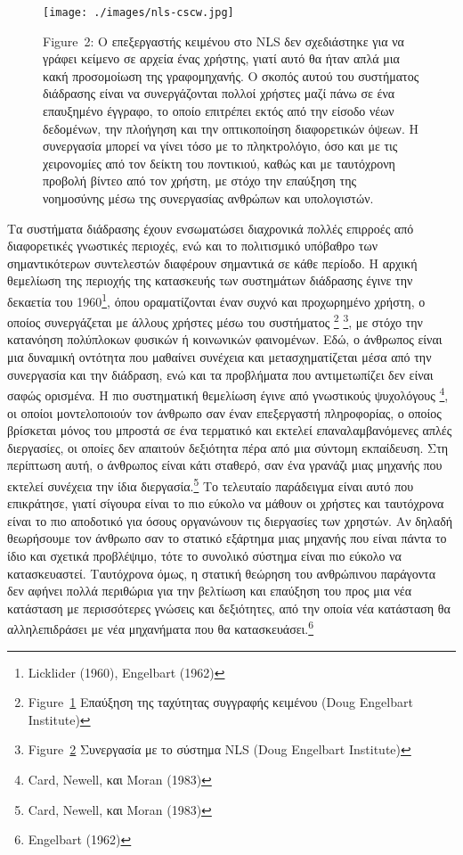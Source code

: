 \documentclass[
]{article}
\begin{document}
\leavevmode{}%
\begin{figure}
\hypertarget{fig:nls-cscw}{%
\centering
\texttt{[image: ./images/nls-cscw.jpg]}
\caption{Figure~2: Ο επεξεργαστής κειμένου στο NLS δεν σχεδιάστηκε για
να γράφει κείμενο σε αρχεία ένας χρήστης, γιατί αυτό θα ήταν απλά μια
κακή προσομοίωση της γραφομηχανής. Ο σκοπός αυτού του συστήματος
διάδρασης είναι να συνεργάζονται πολλοί χρήστες μαζί πάνω σε ένα
επαυξημένο έγγραφο, το οποίο επιτρέπει εκτός από την είσοδο νέων
δεδομένων, την πλοήγηση και την οπτικοποίηση διαφορετικών όψεων. Η
συνεργασία μπορεί να γίνει τόσο με το πληκτρολόγιο, όσο και με τις
χειρονομίες από τον δείκτη του ποντικιού, καθώς και με ταυτόχρονη
προβολή βίντεο από τον χρήστη, με στόχο την επαύξηση της νοημοσύνης μέσω
της συνεργασίας ανθρώπων και υπολογιστών.}\label{fig:nls-cscw}
}
\end{figure}

Τα συστήματα διάδρασης έχουν ενσωματώσει διαχρονικά πολλές επιρροές από
διαφορετικές γνωστικές περιοχές, ενώ και το πολιτισμικό υπόβαθρο των
σημαντικότερων συντελεστών διαφέρουν σημαντικά σε κάθε περίοδο. Η αρχική
θεμελίωση της περιοχής της κατασκευής των συστημάτων διάδρασης έγινε την
δεκαετία του 1960\footnote{Licklider (1960), Engelbart (1962)}, όπου
οραματίζονται έναν συχνό και προχωρημένο χρήστη, ο οποίος συνεργάζεται
με άλλους χρήστες μέσω του συστήματος \footnote{Figure~\protect\hyperlink{fig:augmentation-typewriter}{1}
  Επαύξηση της ταχύτητας συγγραφής κειμένου (Doug Engelbart Institute)}
\footnote{Figure~\protect\hyperlink{fig:nls-cscw}{2} Συνεργασία με το
  σύστημα NLS (Doug Engelbart Institute)}, με στόχο την κατανόηση
πολύπλοκων φυσικών ή κοινωνικών φαινομένων. Εδώ, ο άνθρωπος είναι μια
δυναμική οντότητα που μαθαίνει συνέχεια και μετασχηματίζεται μέσα από
την συνεργασία και την διάδραση, ενώ και τα προβλήματα που αντιμετωπίζει
δεν είναι σαφώς ορισμένα. Η πιο συστηματική θεμελίωση έγινε από
γνωστικούς ψυχολόγους \footnote{Card, Newell, και Moran (1983)}, οι
οποίοι μοντελοποιούν τον άνθρωπο σαν έναν επεξεργαστή πληροφορίας, ο
οποίος βρίσκεται μόνος του μπροστά σε ένα τερματικό και εκτελεί
επαναλαμβανόμενες απλές διεργασίες, οι οποίες δεν απαιτούν δεξιότητα
πέρα από μια σύντομη εκπαίδευση. Στη περίπτωση αυτή, ο άνθρωπος είναι
κάτι σταθερό, σαν ένα γρανάζι μιας μηχανής που εκτελεί συνέχεια την ίδια
διεργασία.\footnote{Card, Newell, και Moran (1983)} Το τελευταίο
παράδειγμα είναι αυτό που επικράτησε, γιατί σίγουρα είναι το πιο εύκολο
να μάθουν οι χρήστες και ταυτόχρονα είναι το πιο αποδοτικό για όσους
οργανώνουν τις διεργασίες των χρηστών. Αν δηλαδή θεωρήσουμε τον άνθρωπο
σαν το στατικό εξάρτημα μιας μηχανής που είναι πάντα το ίδιο και σχετικά
προβλέψιμο, τότε το συνολικό σύστημα είναι πιο εύκολο να κατασκευαστεί.
Ταυτόχρονα όμως, η στατική θεώρηση του ανθρώπινου παράγοντα δεν αφήνει
πολλά περιθώρια για την βελτίωση και επαύξηση του προς μια νέα κατάσταση
με περισσότερες γνώσεις και δεξιότητες, από την οποία νέα κατάσταση θα
αλληλεπιδράσει με νέα μηχανήματα που θα κατασκευάσει.\footnote{Engelbart
  (1962)}
\end{document}
